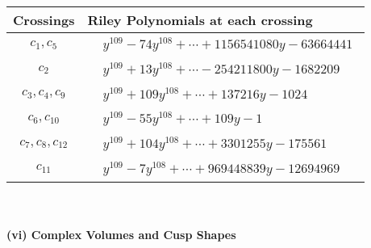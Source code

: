 \documentclass[1p]{elsarticle_modified}
\theoremstyle{definition}
\begin{document}
\begin{tabular}{m{50pt}|m{274pt}}
Crossings & \hspace{64pt}Riley Polynomials at each crossing \\
\hline $$\begin{aligned}c_{1},c_{5}\end{aligned}$$&$\begin{aligned}
&y^{109}-74 y^{108}+\cdots+1156541080 y-63664441
\end{aligned}$\\
\hline $$\begin{aligned}c_{2}\end{aligned}$$&$\begin{aligned}
&y^{109}+13 y^{108}+\cdots-254211800 y-1682209
\end{aligned}$\\
\hline $$\begin{aligned}c_{3},c_{4},c_{9}\end{aligned}$$&$\begin{aligned}
&y^{109}+109 y^{108}+\cdots+137216 y-1024
\end{aligned}$\\
\hline $$\begin{aligned}c_{6},c_{10}\end{aligned}$$&$\begin{aligned}
&y^{109}-55 y^{108}+\cdots+109 y-1
\end{aligned}$\\
\hline $$\begin{aligned}c_{7},c_{8},c_{12}\end{aligned}$$&$\begin{aligned}
&y^{109}+104 y^{108}+\cdots+3301255 y-175561
\end{aligned}$\\
\hline $$\begin{aligned}c_{11}\end{aligned}$$&$\begin{aligned}
&y^{109}-7 y^{108}+\cdots+969448839 y-12694969
\end{aligned}$\\
\hline
\end{tabular}\\~\\
\newpage\flushleft \textbf{(vi) Complex Volumes and Cusp Shapes}
\end{document}
